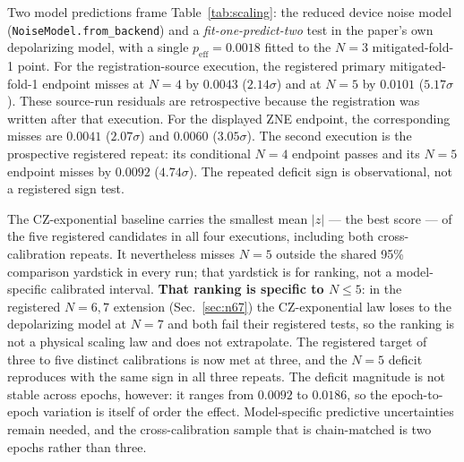 \documentclass[conference]{IEEEtran}
\begin{document}
Two model predictions frame Table~\ref{tab:scaling}: the reduced device noise
model (\texttt{NoiseModel.from\_backend}) and a \emph{fit-one-predict-two}
test in the paper's own depolarizing model, with a single
$p_{\mathrm{eff}}=0.0018$ fitted to the $N{=}3$ mitigated-fold-1 point.
For the registration-source execution, the registered primary
mitigated-fold-1 endpoint misses at $N=4$ by $0.0043$ ($2.14\sigma$) and at
$N=5$ by $0.0101$ ($5.17\sigma$). These source-run residuals are
retrospective because the registration was written after that execution.
For the displayed ZNE endpoint, the corresponding misses are $0.0041$
($2.07\sigma$) and $0.0060$ ($3.05\sigma$). The second execution is the
prospective registered repeat: its conditional $N=4$ endpoint passes and
its $N=5$ endpoint misses by $0.0092$ ($4.74\sigma$). The repeated deficit
sign is observational, not a registered sign test.

The CZ-exponential baseline carries the smallest mean $|z|$ --- the best score
--- of the five registered candidates in all four executions, including both
cross-calibration repeats. It nevertheless
misses $N=5$ outside the shared 95\% comparison yardstick in every run; that
yardstick is for ranking, not a model-specific calibrated interval.
\textbf{That ranking is specific to $N\le 5$}: in the registered $N=6,7$
extension (Sec.~\ref{sec:n67}) the CZ-exponential law loses to the depolarizing
model at $N{=}7$ and both fail their registered tests, so the ranking is not a
physical scaling law and does not extrapolate.
The registered target of three to five distinct calibrations is now met at
three, and the $N=5$ deficit reproduces with the same sign in all three
repeats. The deficit magnitude is not stable across epochs, however: it ranges
from $0.0092$ to $0.0186$, so the epoch-to-epoch variation is itself of order
the effect. Model-specific predictive uncertainties remain needed, and the
cross-calibration sample that is chain-matched is two epochs rather than three.
\end{document}
